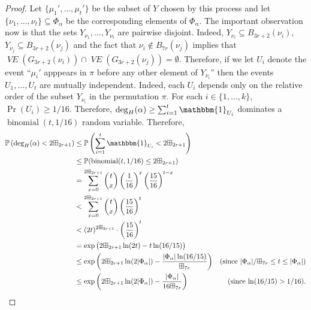 \documentclass{patmorin}
\newcommand{\vol}[1]{\boxplus_{#1}}
\DeclareMathOperator{\binomial}{binomial}
\DeclareMathOperator{\VE}{\mathit{VE}}
\begin{document}
\begin{proof}
  Let $\{\mu_1',\ldots,\mu_t'\}$ be the subset of $Y$ chosen by this process and let $\{\nu_1,\ldots,\nu_t\}\subseteq\Phi_\alpha$ be the corresponding elements of $\Phi_\alpha$.  The important observation now is that the sets $Y_{\nu_1},\ldots,Y_{\nu_t}$ are pairwise disjoint.  Indeed, $Y_{\nu_i}\subseteq B_{3r+2}(\nu_i)$, $Y_{\nu_j}\subseteq B_{3r+2}(\nu_j)$ and the fact that $\nu_i\not\in B_{7r}(\nu_j)$ implies that $\VE(G_{3r+2}(\nu_i))\cap \VE(G_{3r+2}(\nu_j))=\emptyset$.  Therefore, if we let $U_i$ denote the event ``$\mu_i'$ apppears in $\pi$ before any other element of $Y_{\nu_i}$'' then the events $U_1,\ldots,U_t$ are mutually independent.  Indeed, each $U_i$ depends only on the relative order of the subset $Y_{\nu_i}$ in the permutation $\pi$.  For each $i\in\{1,\ldots,k\}$, $\Pr(U_i)\ge 1/16$.  Therefore, $\deg_H(\alpha)\ge \sum_{i=1}^t \mathbbm{1}_{U_i}$ dominates a $\binomial(t,1/16)$ random variable.  Therefore,
  \begin{align}
    \Pr\left(\deg_H(\alpha)< 2\vol{2r+1}\right)
    & \le \Pr\left(\sum_{i=1}^t \mathbbm{1}_{U_i} < 2\vol{2r+1}\right) \notag \\
    & \le \Pr(\binomial(t,1/16)\le 2\vol{2r+1}) \notag \\
    & = \sum_{x=0}^{2\vol{2r+1}} \binom{t}{x}\left(\frac{1}{16}\right)^x\left(\frac{15}{16}\right)^{t-x} \notag \\
    & < \sum_{x=0}^{2\vol{2r+1}} \binom{t}{x}\left(\frac{15}{16}\right)^{t} \notag \\
    & < (2t)^{2\vol{2r+1}}\cdot\left(\frac{15}{16}\right)^{t} \notag \\
    & = \exp\big({2\vol{2r+1}}\ln(2t)-t\ln(16/15)\big) \notag \\
    & \le \exp\left({2\vol{2r+1}}\ln(2|\Phi_\alpha|)-\frac{|\Phi_\alpha|\ln(16/15)}{\vol{7r}}\right)
      & \text{(since $|\Phi_\alpha|/\vol{7r} \le t \le |\Phi_\alpha|$)} \notag \\
    & \le \exp\left({2\vol{2r+1}}\ln(2|\Phi_\alpha|)-\frac{|\Phi_\alpha|}{16\vol{7r}}\right)
      & \text{(since $\ln(16/15) > 1/16$).}
       \label{probability}
  \end{align}



\end{proof}
\end{document}
